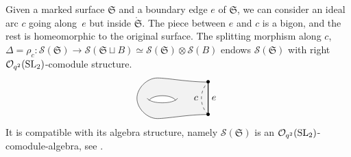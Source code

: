 \documentclass[pdftex]{sigma}%
\numberwithin{equation}{section}
\newcommand{\Oq}{\mathcal{O}_{q^2}({\rm SL}_2)}
\begin{document}
Given a marked surface $\mathfrak{S}$ and a boundary edge $e$ of $\mathfrak{S}$, we can consider an ideal arc $c$ going along~$e$ but inside $\mathring{\mathfrak{S}}$. The piece between $e$ and $c$ is a bigon, and the rest is homeomorphic to the original surface. The splitting morphism along $c$, $\Delta = \rho_c\colon \mathscr{S}(\mathfrak{S}) \to \mathscr{S}(\mathfrak{S}\sqcup B)\simeq \mathscr{S}(\mathfrak{S})\otimes \mathscr{S}(B)$ endows $\mathscr{S}(\mathfrak{S})$ with right $\Oq$-comodule structure.
$$
\begin{tikzpicture}[xscale = 0.75, yscale = 0.75,baseline = 10pt]
\fill[gray!10] (3.5,0.2) coordinate (B)	.. controls (2.5,0.2) and (1.5,0 ) .. (1,0)	.. controls (0.5,0 ) and (0,0.5 ) .. (0,1)	.. controls (0,1.5 ) and (0.5,2 ) .. (1,2)	.. controls (1.5,2 ) and (2.5,1.8) .. (3.5,1.8) coordinate (H) -- cycle ;
\fill[white] (0.6,0.9) .. controls (0.7,0.7) and (1.8,0.7) .. (1.9,0.9) .. controls (1.7,1.2) and (0.8,1.2) .. (0.6,0.9);
\draw (0.5,1) .. controls (0.7,0.7) and (1.8,0.7) .. (2,1);
\draw (0.6,0.9) .. controls (0.8,1.2) and (1.7,1.2) .. (1.9,0.9);
\draw (3.5,0.2) node{\small $\bullet$}	.. controls (2.5,0.2) and (1.5,0 ) .. (1,0)	.. controls (0.5,0 ) and (0,0.5 ) .. (0,1)	.. controls (0,1.5 ) and (0.5,2 ) .. (1,2)	.. controls (1.5,2 ) and (2.5,1.8) .. (3.5,1.8) node{\small $\bullet$};
\draw[thick] (B) -- (H) node[midway,right]{$e$};
\path[dashed, bend left = 150pt, in = 135, out = 45] (B) edge node[midway,left]{$c$} (H);
\end{tikzpicture}
$$
It is compatible with its algebra structure, namely $\mathscr{S}(\mathfrak{S})$ is an $\Oq$-comodule-algebra, see \cite[Proposition~4.1]{Cos}.
\end{document}

